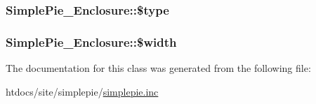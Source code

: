 \hypertarget{class_simple_pie___enclosure_a4fc8b9cccf2c87ea99536a157ebbaf28}{
\subsubsection[{\$type}]{\setlength{\rightskip}{0pt plus 5cm}Simple\-Pie\-\_\-\-Enclosure\-::\$type}}\label{class_simple_pie___enclosure_a4fc8b9cccf2c87ea99536a157ebbaf28}
\hypertarget{class_simple_pie___enclosure_ac1d48513db6b0521d3e355630fd419ee}{
\subsubsection[{\$width}]{\setlength{\rightskip}{0pt plus 5cm}Simple\-Pie\-\_\-\-Enclosure\-::\$width}}\label{class_simple_pie___enclosure_ac1d48513db6b0521d3e355630fd419ee}


The documentation for this class was generated from the following file\-:\begin{DoxyCompactItemize}
\item 
htdocs/site/simplepie/\hyperlink{simplepie_8inc}{simplepie.\-inc}\end{DoxyCompactItemize}
